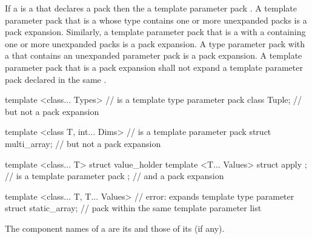 \documentclass{wg21}
\begin{document}

\pnum
If a  is a
 that declares a
pack 
then the 
 a template parameter pack .
A template parameter pack that is a  whose type
contains one or more unexpanded packs is a pack expansion. Similarly,
a template parameter pack that is a  with a
 containing one or more unexpanded
packs is a pack expansion.
A type parameter pack with a  that
contains an unexpanded parameter pack is a pack expansion.
A template parameter pack that is a pack
expansion shall not expand a template parameter pack declared in the same
.
\begin{example}
\begin{codeblock}
    template <class... Types>                       //  is a template type parameter pack
    class Tuple;                                 // but not a pack expansion

    template <class T, int... Dims>                 //  is a  template parameter pack
    struct multi_array;                          // but not a pack expansion

    template <class... T>
    struct value_holder {
        template <T... Values> struct apply { };    //  is a  template parameter pack
    };                                            // and a pack expansion

    template <class... T, T... Values>              // error:  expands template type parameter
    struct static_array;                          // pack  within the same template parameter list
\end{codeblock}
\end{example}

%
The component names of a  are
its  and
those of its  (if any).
\end{document}
